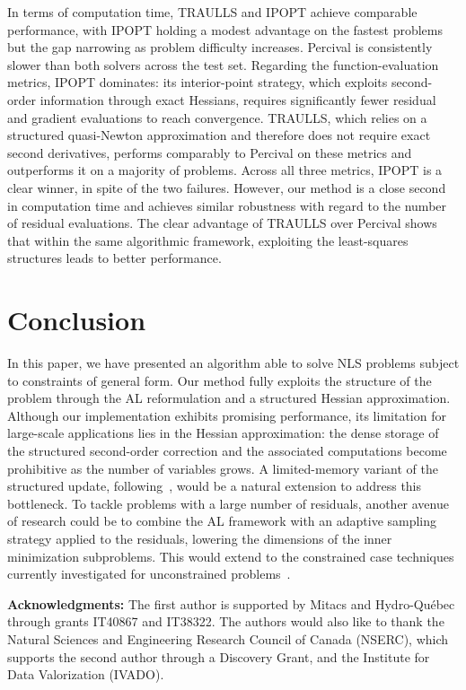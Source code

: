 \documentclass{article}
\numberwithin{equation}{section}
\theoremstyle{plain}
\begin{document}
	In terms of computation time, TRAULLS and IPOPT achieve comparable performance, with
	IPOPT holding a modest advantage on the fastest problems but the gap narrowing as
	problem difficulty increases. Percival is consistently slower than both solvers across the
	test set. Regarding the function-evaluation metrics, IPOPT dominates: its interior-point
	strategy, which exploits second-order information through exact Hessians, requires
	significantly fewer residual and gradient evaluations to reach convergence. TRAULLS, which
	relies on a structured quasi-Newton approximation and therefore does not require exact
	second derivatives, performs comparably to Percival on these metrics and outperforms it on
	a majority of problems.
	Across all three metrics, IPOPT is a clear winner, in spite of the two failures. However, our method is a close second in computation time and achieves similar robustness with regard to the number of residual evaluations. The clear advantage of TRAULLS over Percival shows that within the same algorithmic framework, exploiting the least-squares structures leads to better performance.
	
	\section*{Conclusion}
	In this paper, we have presented an algorithm able to solve NLS problems subject to constraints of general form. Our method fully exploits the structure of the problem through the AL reformulation and a structured Hessian approximation. 
	Although our implementation exhibits promising performance, its limitation for large-scale applications lies in the Hessian approximation: the dense storage of the structured second-order correction and the associated computations become prohibitive as the number of variables grows. A limited-memory variant of the structured update, following~\cite{byrd-etal:1994}, would be a natural extension to address this bottleneck. To tackle problems with a large number of residuals, another avenue of research could be to combine the AL framework with an adaptive sampling strategy applied to the residuals, lowering the dimensions of the inner minimization subproblems. This would extend to the constrained case techniques currently investigated for unconstrained problems~\cite{bellavia-etal:2026}.
	
	\vspace{1em}\noindent\textbf{Acknowledgments:} The first author is supported by Mitacs and  Hydro-Qu\'ebec through grants IT40867 and IT38322. The authors would also like to thank the Natural Sciences and Engineering Research Council of Canada (NSERC), which supports the second author through a Discovery Grant, and the Institute for Data Valorization (IVADO).
	
\end{document}
